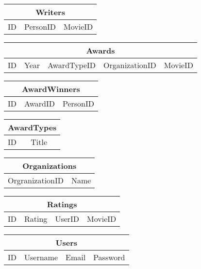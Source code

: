 \noindent\begin{tabular}{|l|l|l|}
\hline
\multicolumn{3}{|c|}{Writers} \\ \hline
ID & PersonID & MovieID\\ \hline
\end{tabular}

\noindent\begin{tabular}{|l|l|l|l|l|}
\hline
\multicolumn{5}{|c|}{Awards} \\ \hline
ID & Year & AwardTypeID & OrganizationID & MovieID \\ \hline
\end{tabular}

\noindent\begin{tabular}{|l|l|l|}
\hline
\multicolumn{3}{|c|}{AwardWinners} \\ \hline
ID & AwardID & PersonID \\ \hline
\end{tabular}

\noindent\begin{tabular}{|l|l|}
\hline
\multicolumn{2}{|c|}{AwardTypes} \\ \hline
ID & Title \\ \hline
\end{tabular}

\noindent\begin{tabular}{|l|l|}
\hline
\multicolumn{2}{|c|}{Organizations} \\ \hline
OrgranizationID & Name \\ \hline
\end{tabular}

\noindent\begin{tabular}{|l|l|l|l|}
\hline
\multicolumn{4}{|c|}{Ratings} \\ \hline
ID & Rating & UserID & MovieID \\ \hline
\end{tabular}

\noindent\begin{tabular}{|l|l|l|l|}
\hline
\multicolumn{4}{|c|}{Users} \\ \hline
ID & Username & Email & Password \\ \hline
\end{tabular}

